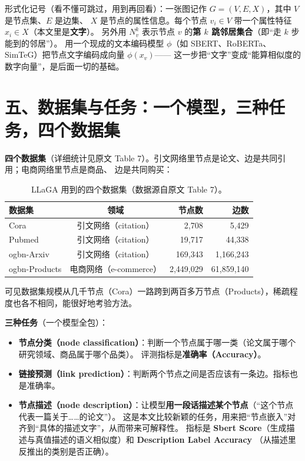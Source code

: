 \documentclass[11pt,UTF8,fontset=fandol]{ctexart}
\begin{document}
形式化记号（看不懂可跳过，用到再回看）：一张图记作 $G=(V,E,X)$，其中 $V$ 是节点集、$E$ 是边集、
$X$ 是节点的属性信息。每个节点 $v_i\in V$ 带一个属性特征 $x_i\in X$（本文里是\textbf{文字}）。
另外用 $N_v^k$ 表示节点 $v$ 的\textbf{第 $k$ 跳邻居集合}（即“走 $k$ 步能到的邻居”）。
用一个现成的文本编码模型 $\phi$（如 SBERT、RoBERTa、SimTeG）把节点文字编码成向量 $\phi(x_v)$——
这一步把“文字”变成“能算相似度的数字向量”，是后面一切的基础。

\section{五、数据集与任务：一个模型，三种任务，四个数据集}

\textbf{四个数据集}（详细统计见原文 Table 7）。引文网络里节点是论文、边是共同引用；电商网络里节点是商品、
边是共同购买：

\begin{table}[H]\centering
\caption{LLaGA 用到的四个数据集（数据源自原文 Table 7）。}
\begin{tabular}{lcrr}
\toprule
\textbf{数据集} & \textbf{领域} & \textbf{节点数} & \textbf{边数} \\
\midrule
Cora     & 引文网络（citation）     & 2{,}708     & 5{,}429 \\
Pubmed   & 引文网络（citation）     & 19{,}717    & 44{,}338 \\
ogbn-Arxiv     & 引文网络（citation）     & 169{,}343   & 1{,}166{,}243 \\
ogbn-Products  & 电商网络（e-commerce）   & 2{,}449{,}029 & 61{,}859{,}140 \\
\bottomrule
\end{tabular}
\end{table}

可见数据集规模从几千节点（Cora）一路跨到两百多万节点（Products），稀疏程度也各不相同，能很好地考验方法。

\textbf{三种任务}（一个模型全包）：
\begin{itemize}[leftmargin=2em]
  \item \textbf{节点分类（node classification）}：判断一个节点属于哪一类（论文属于哪个研究领域、商品属于哪个品类）。
        评测指标是\textbf{准确率（Accuracy）}。
  \item \textbf{链接预测（link prediction）}：判断两个节点之间是否应该有一条边。指标也是准确率。
  \item \textbf{节点描述（node description）}：让模型\textbf{用一段话描述某个节点}（“这个节点代表一篇关于……的论文”）。
        这是本文比较新颖的任务，用来把“节点嵌入”对齐到“具体的描述文字”，从而带来可解释性。
        指标是 \textbf{Sbert Score}（生成描述与真值描述的语义相似度）和 \textbf{Description Label Accuracy}
        （从描述里反推出的类别是否正确）。
\end{itemize}
\end{document}
